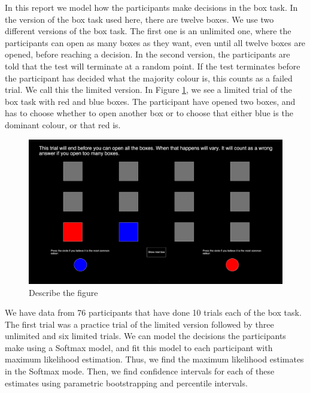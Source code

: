 In this report we model how the participants make decisions in the box task. In the version of the box task used here, there are twelve boxes. We use two different versions of the box task. The first one is an unlimited one, where the participants can open as many boxes as they want, even until all twelve boxes are opened, before reaching a decision. In the second version, the participants are told that the test will terminate at a random point. If the test terminates before the participant has decided what the majority colour is, this counts as a failed trial. We call this the limited version. In Figure \ref{picture_of_box_task}, we see a limited trial of the box task with red and blue boxes. The participant have opened two boxes, and has to choose whether to open another box or to choose that either blue is the dominant colour, or that red is. 

\begin{figure}
    \centering
    \includegraphics[scale=0.486]{Sections/Box task 2.png}
    \caption{Describe the figure}
    \label{picture_of_box_task}
\end{figure}

We have data from 76 participants that have done 10 trials each of the box task. The first trial was a practice trial of the limited version followed by three unlimited and six limited trials. We can model the decisions the participants make using a Softmax model, and fit this model to each participant with maximum likelihood estimation. Thus, we find the maximum likelihood estimates in the Softmax mode. Then, we find confidence intervals for each of these estimates using parametric bootstrapping and percentile intervals. 

